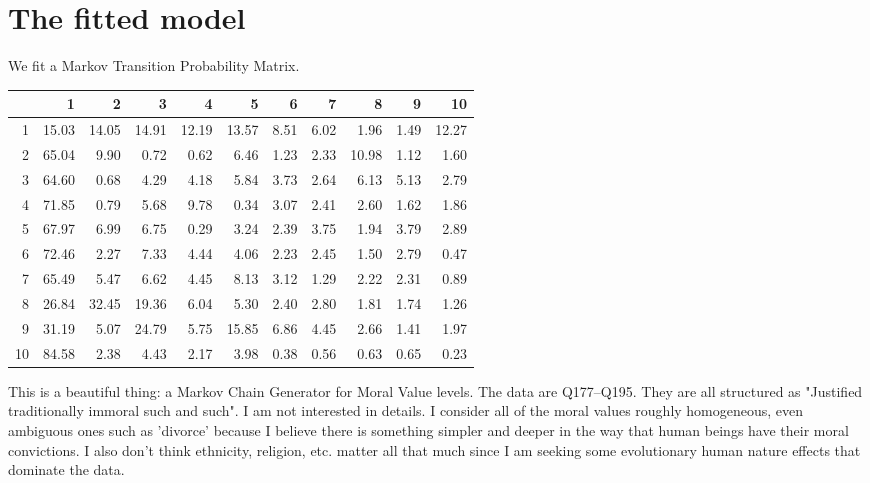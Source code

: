 \documentclass{amsart}
\begin{document}
\section{The fitted model}

We fit a Markov Transition Probability Matrix. 

\begin{table}[ht]
\centering
\begin{tabular}{rrrrrrrrrrr}
  \hline
 & 1 & 2 & 3 & 4 & 5 & 6 & 7 & 8 & 9 & 10 \\ 
  \hline
1 & 15.03 & 14.05 & 14.91 & 12.19 & 13.57 & 8.51 & 6.02 & 1.96 & 1.49 & 12.27 \\ 
  2 & 65.04 & 9.90 & 0.72 & 0.62 & 6.46 & 1.23 & 2.33 & 10.98 & 1.12 & 1.60 \\ 
  3 & 64.60 & 0.68 & 4.29 & 4.18 & 5.84 & 3.73 & 2.64 & 6.13 & 5.13 & 2.79 \\ 
  4 & 71.85 & 0.79 & 5.68 & 9.78 & 0.34 & 3.07 & 2.41 & 2.60 & 1.62 & 1.86 \\ 
  5 & 67.97 & 6.99 & 6.75 & 0.29 & 3.24 & 2.39 & 3.75 & 1.94 & 3.79 & 2.89 \\ 
  6 & 72.46 & 2.27 & 7.33 & 4.44 & 4.06 & 2.23 & 2.45 & 1.50 & 2.79 & 0.47 \\ 
  7 & 65.49 & 5.47 & 6.62 & 4.45 & 8.13 & 3.12 & 1.29 & 2.22 & 2.31 & 0.89 \\ 
  8 & 26.84 & 32.45 & 19.36 & 6.04 & 5.30 & 2.40 & 2.80 & 1.81 & 1.74 & 1.26 \\ 
  9 & 31.19 & 5.07 & 24.79 & 5.75 & 15.85 & 6.86 & 4.45 & 2.66 & 1.41 & 1.97 \\ 
  10 & 84.58 & 2.38 & 4.43 & 2.17 & 3.98 & 0.38 & 0.56 & 0.63 & 0.65 & 0.23 \\ 
   \hline
\end{tabular}
\end{table}

This is a beautiful thing: a Markov Chain Generator for Moral Value levels.  The data are Q177--Q195.  They are all structured as "Justified traditionally immoral such and such".  I am not interested in details.  I consider all of the moral values roughly homogeneous, even ambiguous ones such as 'divorce' because I believe there is something simpler and deeper in the way that human beings have their moral convictions.  I also don't think ethnicity, religion, etc. matter all that much since I am seeking some evolutionary human nature effects that dominate the data.
\end{document}
